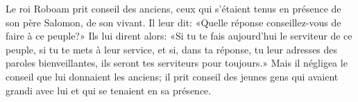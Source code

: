 Le roi Roboam prit conseil des anciens,
	ceux qui s’étaient tenus en présence de son père Salomon, de son vivant.
Il leur dit:
		«Quelle réponse conseillez-vous de faire à ce peuple?»
Ils lui dirent alors:
	«Si tu te fais aujourd’hui le serviteur de ce peuple, si tu te mets à leur service,
	et si, dans ta réponse, tu leur adresses des paroles bienveillantes,
	ils seront tes serviteurs pour toujours.»
Mais il négligea le conseil que lui donnaient les anciens;
	il prit conseil des jeunes gens qui avaient grandi avec lui
	et qui se tenaient en sa présence.
